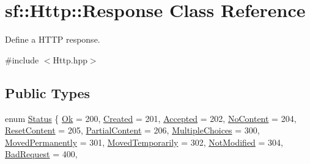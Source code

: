 \hypertarget{classsf_1_1_http_1_1_response}{}\section{sf\+:\+:Http\+:\+:Response Class Reference}
\label{classsf_1_1_http_1_1_response}


Define a H\+T\+TP response.  




{\ttfamily \#include $<$Http.\+hpp$>$}

\subsection*{Public Types}
\begin{DoxyCompactItemize}
\item 
enum \mbox{\hyperlink{classsf_1_1_http_1_1_response_a663e071978e30fbbeb20ed045be874d8}{Status}} \{ \newline
\mbox{\hyperlink{classsf_1_1_http_1_1_response_a663e071978e30fbbeb20ed045be874d8a0158f932254d3f09647dd1f64bd43832}{Ok}} = 200, 
\mbox{\hyperlink{classsf_1_1_http_1_1_response_a663e071978e30fbbeb20ed045be874d8a0a6e8bafa9365a0ed10b8a9cbfd0649b}{Created}} = 201, 
\mbox{\hyperlink{classsf_1_1_http_1_1_response_a663e071978e30fbbeb20ed045be874d8ad328945457bd2f0d65107ba6b5ccd443}{Accepted}} = 202, 
\mbox{\hyperlink{classsf_1_1_http_1_1_response_a663e071978e30fbbeb20ed045be874d8aefde9e4abf5682dcd314d63143be42e0}{No\+Content}} = 204, 
\newline
\mbox{\hyperlink{classsf_1_1_http_1_1_response_a663e071978e30fbbeb20ed045be874d8a77327cc2a5e34cc64030b322e61d12a8}{Reset\+Content}} = 205, 
\mbox{\hyperlink{classsf_1_1_http_1_1_response_a663e071978e30fbbeb20ed045be874d8a0cfae3ab0469b73dfddc54312a5e6a8a}{Partial\+Content}} = 206, 
\mbox{\hyperlink{classsf_1_1_http_1_1_response_a663e071978e30fbbeb20ed045be874d8add95cbd8fa27516821f763488557f96b}{Multiple\+Choices}} = 300, 
\mbox{\hyperlink{classsf_1_1_http_1_1_response_a663e071978e30fbbeb20ed045be874d8a2f91651db3a09628faf68cbcefa0810a}{Moved\+Permanently}} = 301, 
\newline
\mbox{\hyperlink{classsf_1_1_http_1_1_response_a663e071978e30fbbeb20ed045be874d8a05c50d7b17c844e0b909e5802d5f1587}{Moved\+Temporarily}} = 302, 
\mbox{\hyperlink{classsf_1_1_http_1_1_response_a663e071978e30fbbeb20ed045be874d8a060ebc3af266e6bfe045b89e298e2545}{Not\+Modified}} = 304, 
\mbox{\hyperlink{classsf_1_1_http_1_1_response_a663e071978e30fbbeb20ed045be874d8a3f88a714cf5483ee22f9051e5a3c080a}{Bad\+Request}} = 400, 

\end{DoxyCompactItemize}
